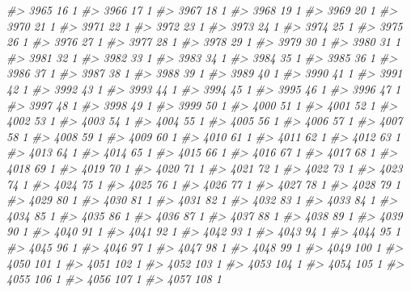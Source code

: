 \documentclass[]{article}
\newenvironment{Shaded}{\begin{snugshade}}{\end{snugshade}}
\newcommand{\CommentTok}[1]{\textcolor[rgb]{0.56,0.35,0.01}{\textit{#1}}}
\begin{document}
\begin{Shaded}
\begin{Highlighting}[]
\CommentTok{#> 3965  16  1}
\CommentTok{#> 3966  17  1}
\CommentTok{#> 3967  18  1}
\CommentTok{#> 3968  19  1}
\CommentTok{#> 3969  20  1}
\CommentTok{#> 3970  21  1}
\CommentTok{#> 3971  22  1}
\CommentTok{#> 3972  23  1}
\CommentTok{#> 3973  24  1}
\CommentTok{#> 3974  25  1}
\CommentTok{#> 3975  26  1}
\CommentTok{#> 3976  27  1}
\CommentTok{#> 3977  28  1}
\CommentTok{#> 3978  29  1}
\CommentTok{#> 3979  30  1}
\CommentTok{#> 3980  31  1}
\CommentTok{#> 3981  32  1}
\CommentTok{#> 3982  33  1}
\CommentTok{#> 3983  34  1}
\CommentTok{#> 3984  35  1}
\CommentTok{#> 3985  36  1}
\CommentTok{#> 3986  37  1}
\CommentTok{#> 3987  38  1}
\CommentTok{#> 3988  39  1}
\CommentTok{#> 3989  40  1}
\CommentTok{#> 3990  41  1}
\CommentTok{#> 3991  42  1}
\CommentTok{#> 3992  43  1}
\CommentTok{#> 3993  44  1}
\CommentTok{#> 3994  45  1}
\CommentTok{#> 3995  46  1}
\CommentTok{#> 3996  47  1}
\CommentTok{#> 3997  48  1}
\CommentTok{#> 3998  49  1}
\CommentTok{#> 3999  50  1}
\CommentTok{#> 4000  51  1}
\CommentTok{#> 4001  52  1}
\CommentTok{#> 4002  53  1}
\CommentTok{#> 4003  54  1}
\CommentTok{#> 4004  55  1}
\CommentTok{#> 4005  56  1}
\CommentTok{#> 4006  57  1}
\CommentTok{#> 4007  58  1}
\CommentTok{#> 4008  59  1}
\CommentTok{#> 4009  60  1}
\CommentTok{#> 4010  61  1}
\CommentTok{#> 4011  62  1}
\CommentTok{#> 4012  63  1}
\CommentTok{#> 4013  64  1}
\CommentTok{#> 4014  65  1}
\CommentTok{#> 4015  66  1}
\CommentTok{#> 4016  67  1}
\CommentTok{#> 4017  68  1}
\CommentTok{#> 4018  69  1}
\CommentTok{#> 4019  70  1}
\CommentTok{#> 4020  71  1}
\CommentTok{#> 4021  72  1}
\CommentTok{#> 4022  73  1}
\CommentTok{#> 4023  74  1}
\CommentTok{#> 4024  75  1}
\CommentTok{#> 4025  76  1}
\CommentTok{#> 4026  77  1}
\CommentTok{#> 4027  78  1}
\CommentTok{#> 4028  79  1}
\CommentTok{#> 4029  80  1}
\CommentTok{#> 4030  81  1}
\CommentTok{#> 4031  82  1}
\CommentTok{#> 4032  83  1}
\CommentTok{#> 4033  84  1}
\CommentTok{#> 4034  85  1}
\CommentTok{#> 4035  86  1}
\CommentTok{#> 4036  87  1}
\CommentTok{#> 4037  88  1}
\CommentTok{#> 4038  89  1}
\CommentTok{#> 4039  90  1}
\CommentTok{#> 4040  91  1}
\CommentTok{#> 4041  92  1}
\CommentTok{#> 4042  93  1}
\CommentTok{#> 4043  94  1}
\CommentTok{#> 4044  95  1}
\CommentTok{#> 4045  96  1}
\CommentTok{#> 4046  97  1}
\CommentTok{#> 4047  98  1}
\CommentTok{#> 4048  99  1}
\CommentTok{#> 4049 100  1}
\CommentTok{#> 4050 101  1}
\CommentTok{#> 4051 102  1}
\CommentTok{#> 4052 103  1}
\CommentTok{#> 4053 104  1}
\CommentTok{#> 4054 105  1}
\CommentTok{#> 4055 106  1}
\CommentTok{#> 4056 107  1}
\CommentTok{#> 4057 108  1}

\end{Highlighting}
\end{Shaded}
\end{document}
